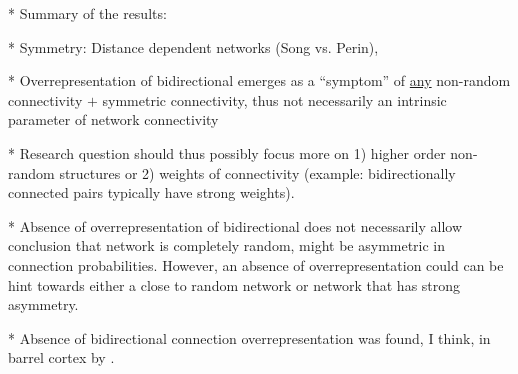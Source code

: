 

* Summary of the results:

* Symmetry: Distance dependent networks (Song vs. Perin),

* Overrepresentation of bidirectional emerges as a \enquote{symptom} of \underline{any} non-random connectivity $+$ symmetric connectivity, thus not necessarily an intrinsic parameter of network connectivity

* Research question should thus possibly focus more on 1) higher order non-random structures or 2) weights of connectivity (example: bidirectionally connected pairs typically have strong weights). 

* Absence of overrepresentation of bidirectional does not necessarily allow conclusion that network is completely random, might be asymmetric in connection probabilities. However, an absence of overrepresentation could can be hint towards either a close to random network or network that has strong asymmetry.

* Absence of bidirectional connection overrepresentation was found, I think, in barrel cortex by \cite{Lefort2009}. 

